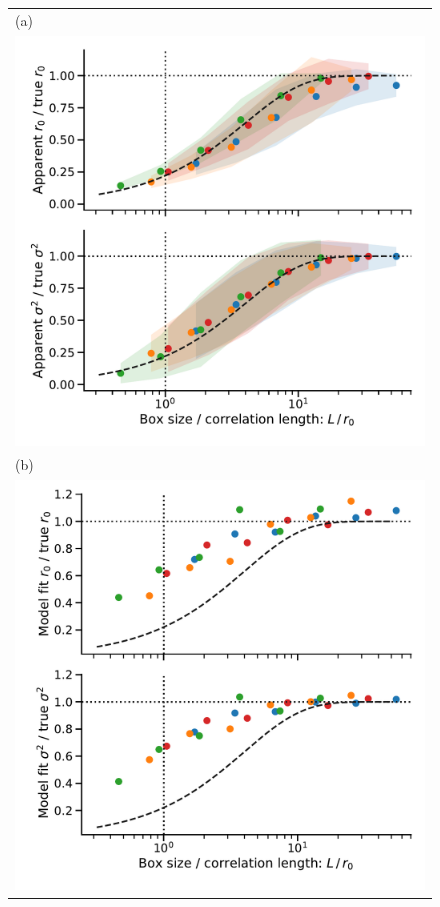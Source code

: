 \documentclass[fleqn,usenatbib, useAMS, a4paper]{mnras}
\begin{document}
\begin{figure}
  \begin{tabular}{@{} l @{}}
    (a)\\ \includegraphics[width=0.95\linewidth]{Figures/fake-3d-finite-box-effect-ems-fluct_sigE_1}
    \\[\bigskipamount]
    (b)\\ \includegraphics[width=0.95\linewidth]{Figures/fake-finite-box-fits-ems-fluct_sigE_1}

\end{tabular}
\end{figure}
\end{document}
